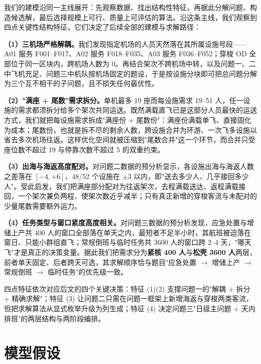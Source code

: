 \documentclass[zihao=-4,a4paper]{ctexart}
\begin{document}
我们的建模沿同一主线展开：先观察数据、找出结构性特征，再据此分解问题、构造候选解，最后选择规模上可行、质量上可评估的算法。沿这条主线，我们观察到四点关键性结构特征，它们决定了后续全部的建模与求解路径：

\textbf{（1）三机场严格解耦。}我们发现指定机场的人员天然落在其所属设施号段——A01 服务 F001--F017、A02 服务 F018--F035、A03 服务 F036--F052；穿梭 OD 全部位于同一区块内，跨机场人数为 0。再结合架次不跨机场中转，以及问题一、二中飞机充足、问题三中机队按机场固定的题设，于是按设施分块即可把总问题分解为三个互不相干的子问题，且不损失任何最优性。

\textbf{（2）"满座 + 尾数"需求拆分。}单机最多 19 座而每设施需求 19--51 人，任一设施的需求都须拆分给多个架次共同运送。既然满载直飞已是这部分人员最快的运送方式，我们就把每设施需求拆成"满座份 + 尾数份"：满座份满载单飞、直接固化为成本；尾数份，也就是拆不尽的剩余人数，跨设施合并为环游、一次飞多设施以省去多次机场往返。这样优化空间就被压缩到"尾数合并"这一个环节，而合并只受座位数不超过 19 与停靠次数不超过 5 的双重约束。

\textbf{（3）出海与海返高度配对。}对问题二数据的预分析显示，各设施出海与海返人数之差落在 $[-4,+6]$、48/52 个设施在 $\pm3$ 以内，即"送去多少人、几乎接回多少人"。受此启发，我们把满座部分配对为往返架次，去程满载送达、返程满载接回，一个架次兼负两程、使架次数近乎减半；只有真正新增的穿梭客流与未配对的少量尾数需要额外运力。

\textbf{（4）任务类型与窗口紧度高度相关。}对问题三数据的预分析发现，应急处置与增储上产共 400 人的窗口全部落在单天之内，最短者不足半小时，其航班被迫落在窗日、只能小群组直飞；常规倒班与临时任务共 3600 人的窗口跨 2--4 天，"哪天飞"才是真正的决策变量。据此我们把需求分为\textbf{紧核 400 人}与\textbf{松壳 3600 人}两层，前者单天固定、后者跨天可选，其求解顺序恰与题目"应急处置 $\to$ 增储上产 $\to$ 常规倒班 $\to$ 临时任务"的优先级一致。

四点特征依次对应后文的四个关键决策：特征 (1)(2) 支撑问题一的"解耦 + 拆分 + 精确求解"；特征 (3) 让问题二只需在问题一框架上新增海返与穿梭两类客流，但把求解算法从显式枚举升级为列生成；特征 (4) 决定问题三"日级主问题 + 天内排班"的两层结构与两阶段编排。

\section{模型假设}
\end{document}
